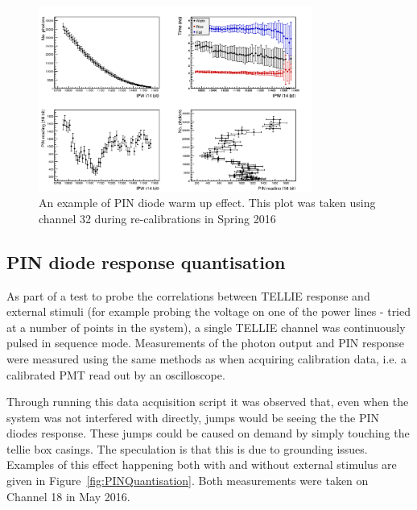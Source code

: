 \documentclass[12pt]{report}
\begin{document}
\begin{figure}[htp]
	\begin{center}
		\includegraphics[width=0.8\textwidth]{PINWarmUp}
		\caption{An example of PIN diode warm up effect. This plot was taken using channel 32 during re-calibrations in Spring 2016}
		\label{fig:PINWarmUp}
	\end{center}
\end{figure}

\subsection{PIN diode response quantisation}
As part of a test to probe the correlations between TELLIE response and external stimuli (for example probing the voltage on one of the power lines - tried at a number of points in the system), a single TELLIE channel was continuously pulsed in sequence mode. Measurements of the photon output and PIN response were measured using the same methods as when acquiring calibration data, i.e. a calibrated PMT read out by an oscilloscope. 

Through running this data acquisition script it was observed that, even when the system was not interfered with directly, jumps would be seeing the the PIN diodes response. These jumps could be caused on demand by simply touching the tellie box casings. The speculation is that this is due to grounding issues. Examples of this effect happening both with and without external stimulus are given in Figure~\ref{fig:PINQuantisation}. Both measurements were taken on Channel 18 in May 2016. 
\end{document}

